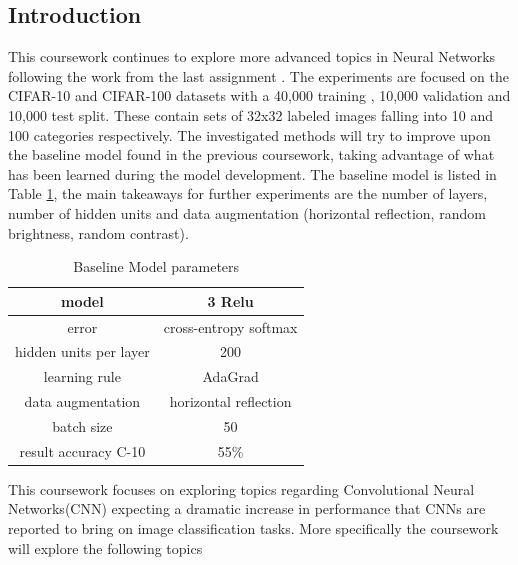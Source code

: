 \documentclass[12pt]{article}
\begin{document}
\maketitle


\subsection*{Introduction}

This coursework continues to explore more advanced topics in Neural Networks following the work from the last assignment \cite{me}. The experiments are focused on the CIFAR-10 and CIFAR-100 datasets with a 40,000 training , 10,000 validation and 10,000 test split. These contain sets of 32x32 labeled images falling into 10 and 100 categories respectively. The investigated methods will try to improve upon the baseline model found in the previous coursework, taking advantage of what has been learned during the model development. The baseline model is listed in Table \ref{tab:baseline}, the main takeaways for further experiments are the number of layers, number of hidden units and data augmentation (horizontal reflection, random brightness, random contrast). 


\begin{table}[H]
\centering
\begin{tabular}[h]{| c | c |}
\hline
model & 3 Relu  \\
\hline
error & cross-entropy softmax   \\
\hline
hidden units per layer & 200   \\
\hline
learning rule & AdaGrad   \\
\hline 
data augmentation & horizontal reflection  \\
\hline
batch size & 50   \\
\hline
result accuracy C-10& 55\%   \\
\hline
\end{tabular} 
\caption{Baseline Model parameters}
\label{tab:baseline}
\end{table}

This coursework focuses on exploring topics regarding Convolutional Neural Networks(CNN) expecting a dramatic increase in performance that CNNs are reported to bring on image classification tasks\cite{inspiration}\cite{bestprac}\cite{frac}. More specifically the coursework will explore the following topics
\end{document}

